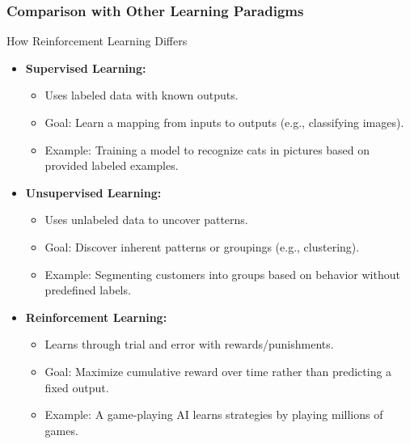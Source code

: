 \documentclass[aspectratio=169]{beamer}
\begin{document}
\begin{frame}[fragile]
    \frametitle{Comparison with Other Learning Paradigms}
    \begin{block}{How Reinforcement Learning Differs}
        \begin{itemize}
            \item \textbf{Supervised Learning:}
                \begin{itemize}
                    \item Uses labeled data with known outputs.
                    \item Goal: Learn a mapping from inputs to outputs (e.g., classifying images).
                    \item Example: Training a model to recognize cats in pictures based on provided labeled examples.
                \end{itemize}

            \item \textbf{Unsupervised Learning:}
                \begin{itemize}
                    \item Uses unlabeled data to uncover patterns.
                    \item Goal: Discover inherent patterns or groupings (e.g., clustering).
                    \item Example: Segmenting customers into groups based on behavior without predefined labels.
                \end{itemize}

            \item \textbf{Reinforcement Learning:}
                \begin{itemize}
                    \item Learns through trial and error with rewards/punishments.
                    \item Goal: Maximize cumulative reward over time rather than predicting a fixed output.
                    \item Example: A game-playing AI learns strategies by playing millions of games.
                \end{itemize}
        \end{itemize}
    \end{block}
\end{frame}
\end{document}

